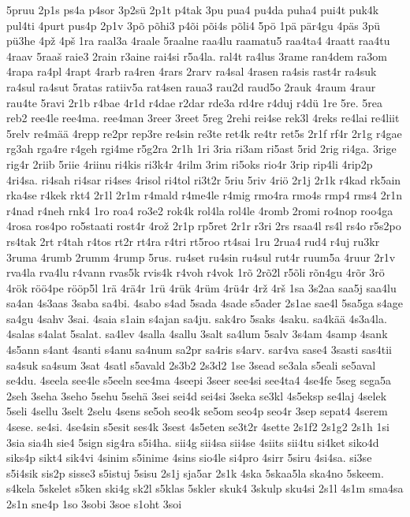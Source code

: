 {5pruu
2p1s
ps4a
p4sor
3p2sü
2p1t
p4tak
3pu
pua4
pu4da
puha4
pui4t
puk4k
pul4ti
4purt
pus4p
2p1v
3põ
põhi3
p4õi
põi4s
põli4
5pö
1pä
pär4gu
4päs
3pü
pü3he
4pž
4pš
1ra
raal3a
4raale
5raalne
raa4lu
raamatu5
raa4ta4
4raatt
raa4tu
4raav
5raaš
raie3
2rain
r3aine
rai4si
r5a4la.
ral4t
ra4lus
3rame
ran4dem
ra3om
4rapa
ra4pl
4rapt
4rarb
ra4ren
4rars
2rarv
ra4sal
4rasen
ra4sis
rast4r
ra4suk
ra4sul
ra4sut
5ratas
ratiiv5a
rat4sen
raua3
rau2d
raud5o
2rauk
4raum
4raur
rau4te
5ravi
2r1b
r4bae
4r1d
r4dae
r2dar
rde3a
rd4re
r4duj
r4dü
1re
5re.
5rea
reb2
ree4le
ree4ma.
ree4man
3reer
3reet
5reg
2rehi
rei4se
rek3l
4reks
re4lai
re4liit
5relv
re4mää
4repp
re2pr
rep3re
re4sin
re3te
ret4k
re4tr
ret5s
2r1f
rf4r
2r1g
r4gae
rg3ah
rga4re
r4geh
rgi4me
r5g2ra
2r1h
1ri
3ria
ri3am
ri5ast
5rid
2rig
ri4ga.
3rige
rig4r
2riib
5riie
4riinu
ri4kis
ri3k4r
4rilm
3rim
ri5oks
rio4r
3rip
rip4li
4rip2p
4ri4sa.
ri4sah
ri4sar
ri4ses
4risol
ri4tol
ri3t2r
5riu
5riv
4riö
2r1j
2r1k
r4kad
rk5ain
rka4se
r4kek
rkt4
2r1l
2r1m
r4mald
r4me4le
r4mig
rmo4ra
rmo4s
rmp4
rms4
2r1n
r4nad
r4neh
rnk4
1ro
roa4
ro3e2
rok4k
rol4la
rol4le
4romb
2romi
ro4nop
roo4ga
4rosa
ros4po
ro5staati
rost4r
4rož
2r1p
rp5ret
2r1r
r3ri
2rs
rsaa4l
rs4l
rs4o
r5s2po
rs4tak
2rt
r4tah
r4tos
rt2r
rt4ra
r4tri
rt5roo
rt4sai
1ru
2rua4
rud4
r4uj
ru3kr
3ruma
4rumb
2rumm
4rump
5rus.
ru4set
ru4sin
ru4sul
rut4r
ruum5a
4ruur
2r1v
rva4la
rva4lu
r4vann
rvas5k
rvis4k
r4voh
r4vok
1rõ
2rõ2l
r5õli
rõn4gu
4rõr
3rö
4rök
röö4pe
rööp5l
1rä
4rä4r
1rü
4rük
4rüm
4rü4r
4rž
4rš
1sa
3s2aa
saa5j
saa4lu
sa4an
4s3aas
3saba
sa4bi.
4sabo
s4ad
5sada
4sade
s5ader
2s1ae
sae4l
5sa5ga
s4age
sa4gu
4sahv
3sai.
4saia
s1ain
s4ajan
sa4ju.
sak4ro
5saks
4saku.
sa4kää
4s3a4la.
4salas
s4alat
5salat.
sa4lev
4salla
4sallu
3salt
sa4lum
5salv
3s4am
4samp
4sank
4s5ann
s4ant
4santi
s4anu
sa4num
sa2pr
sa4ris
s4arv.
sar4va
sase4
3sasti
sas4tii
sa4suk
sa4sum
3sat
4satl
s5avald
2s3b2
2s3d2
1se
3sead
se3ala
s5eali
se5aval
se4du.
4seela
see4le
s5eeln
see4ma
4seepi
3seer
see4si
see4ta4
4se4fe
5seg
sega5a
2seh
3seha
3seho
5sehu
5sehä
3sei
sei4d
sei4si
3seka
se3kl
4s5eksp
se4laj
4selek
5seli
4sellu
3selt
2selu
4sens
se5oh
seo4k
se5om
seo4p
seo4r
3sep
sepat4
4serem
4sese.
se4si.
4se4sin
s5esit
ses4k
3sest
4s5eten
se3t2r
4sette
2s1f2
2s1g2
2s1h
1si
3sia
sia4h
sie4
5sign
sig4ra
s5i4ha.
sii4g
sii4sa
sii4se
4siits
sii4tu
si4ket
siko4d
siks4p
sikt4
sik4vi
4sinim
s5inime
4sins
sio4le
si4pro
4sirr
5siru
4si4sa.
si3se
s5i4sik
sis2p
sisse3
s5istuj
5sisu
2s1j
sja5ar
2s1k
4ska
5skaa5la
ska4no
5skeem.
s4kela
5skelet
s5ken
ski4g
sk2l
s5klas
5skler
skuk4
3skulp
sku4si
2s1l
4s1m
sma4sa
2s1n
sne4p
1so
3sobi
3soe
s1oht
3soi
}
